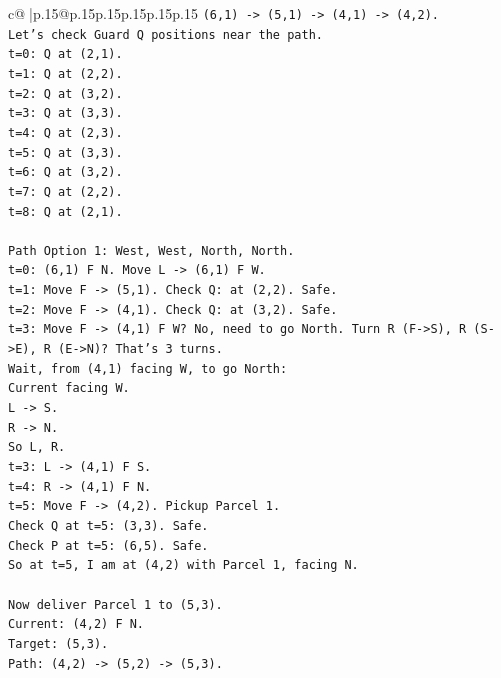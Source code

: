 \documentclass{article}
\begin{document}
{\begin{supertabular}{c@{$\;$}|p{.15\linewidth}@{}p{.15\linewidth}p{.15\linewidth}p{.15\linewidth}p{.15\linewidth}p{.15\linewidth}}
{{{\texttt{(6,1) {-}> (5,1) {-}> (4,1) {-}> (4,2).} \\
\texttt{Let's check Guard Q positions near the path.} \\
\texttt{t=0: Q at (2,1).} \\
\texttt{t=1: Q at (2,2).} \\
\texttt{t=2: Q at (3,2).} \\
\texttt{t=3: Q at (3,3).} \\
\texttt{t=4: Q at (2,3).} \\
\texttt{t=5: Q at (3,3).} \\
\texttt{t=6: Q at (3,2).} \\
\texttt{t=7: Q at (2,2).} \\
\texttt{t=8: Q at (2,1).} \\
\\ 
\texttt{Path Option 1: West, West, North, North.} \\
\texttt{t=0: (6,1) F N. Move L {-}> (6,1) F W.} \\
\texttt{t=1: Move F {-}> (5,1). Check Q: at (2,2). Safe.} \\
\texttt{t=2: Move F {-}> (4,1). Check Q: at (3,2). Safe.} \\
\texttt{t=3: Move F {-}> (4,1) F W? No, need to go North. Turn R (F{-}>S), R (S{-}>E), R (E{-}>N)? That's 3 turns.} \\
\texttt{Wait, from (4,1) facing W, to go North:} \\
\texttt{Current facing W.} \\
\texttt{L {-}> S.} \\
\texttt{R {-}> N.} \\
\texttt{So L, R.} \\
\texttt{t=3: L {-}> (4,1) F S.} \\
\texttt{t=4: R {-}> (4,1) F N.} \\
\texttt{t=5: Move F {-}> (4,2). Pickup Parcel 1.} \\
\texttt{Check Q at t=5: (3,3). Safe.} \\
\texttt{Check P at t=5: (6,5). Safe.} \\
\texttt{So at t=5, I am at (4,2) with Parcel 1, facing N.} \\
\\ 
\texttt{Now deliver Parcel 1 to (5,3).} \\
\texttt{Current: (4,2) F N.} \\
\texttt{Target: (5,3).} \\
\texttt{Path: (4,2) {-}> (5,2) {-}> (5,3).} \\
}}}
\end{supertabular}}
\end{document}
